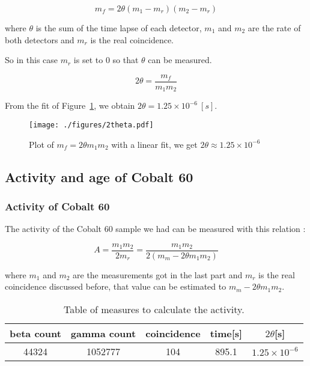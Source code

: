 \documentclass[a4paper,12pt,oneside]{article}
\def \be {\begin{equation}}
\def \ee {\end{equation}}
\begin{document}
\be
	m_f = 2\theta (m_1-m_r) (m_2-m_r)
\ee

where $\theta$ is the sum of the time lapse of each detector, $m_1$ and $m_2$ are the rate of both detectors and $m_r$ is the real coincidence. 

So in this case $m_r$ is set to $0$ so that $\theta$ can be measured.

\be
	2\theta = \frac{m_f}{m_1 m_2}
\ee



From the fit of Figure~\ref{fig:2theta}, we obtain $2\theta = 1.25\times 10^{-6}\ [s]$.

\begin{figure}[h!]
	\begin{center}
	\texttt{[image: ./figures/2theta.pdf]}
	\caption{Plot of $	m_f = 2\theta m_1 m_2$ with a linear fit, we get $2\theta \approx 1.25\times10^{-6}$} \label{fig:2theta}
	\end{center}
\end{figure}



\newpage
\subsection{Activity and age of Cobalt 60}

\subsubsection{Activity of Cobalt 60}

	The activity of the Cobalt 60 sample we had can be measured with this relation :

	\be
		A = \frac{m_1 m_2}{2 m_r} = \frac{m_1 m_2}{2(m_m - 2\theta m_1 m_2)}
	\ee

	where $m_1$ and $m_2$ are the measurements got in the last part and $m_r$ is the real coincidence discussed before, that value can be estimated to $m_m - 2\theta m_1 m_2$.


	\begin{table}[h!]
	\centering
		\begin{tabular}{|c|c|c|c|c|}
			\hline
				beta count	&gamma count	&coincidence	&time[s] 	&$2\theta$[s]\\
			\hline
				44324		&1052777		&104			&895.1		& $1.25\times 10^{-6}$\\
			\hline
		\end{tabular}
		\caption{Table of measures to calculate the activity.}
		\label{tab:poisson}
	\end{table}
\end{document}

